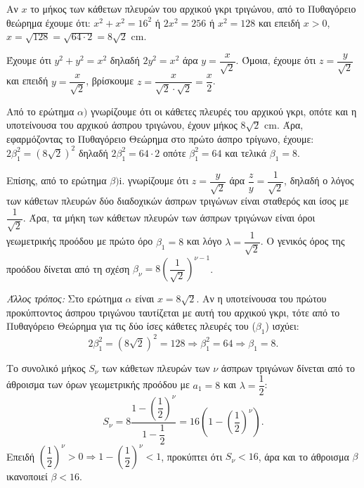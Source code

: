 
\begin{alist}
\item Αν $x$ το μήκος των κάθετων πλευρών του αρχικού γκρι τριγώνου, από το Πυθαγόρειο θεώρημα έχουμε ότι:
$x^2 + x^2 = 16^2$ ή $2x^2 = 256$ ή $x^2 = 128$
και επειδή $x > 0$, $x = \sqrt{128} = \sqrt{64 \cdot 2} = 8\sqrt{2}\text{ cm}$.

\item
\begin{rlist}
\item Έχουμε ότι $y^2 + y^2 = x^2$ δηλαδή $2y^2 = x^2$ άρα $y = \dfrac{x}{\sqrt{2}}$.
Όμοια, έχουμε ότι $z = \dfrac{y}{\sqrt{2}}$ και επειδή $y = \dfrac{x}{\sqrt{2}}$, βρίσκουμε $z = \dfrac{x}{\sqrt{2} \cdot \sqrt{2}} = \dfrac{x}{2}$.
\item Από το ερώτημα $\alpha)$ γνωρίζουμε ότι οι κάθετες πλευρές του αρχικού γκρι, οπότε και η υποτείνουσα του αρχικού άσπρου τριγώνου, έχουν μήκος $8\sqrt{2}\text{ cm}$. Άρα, εφαρμόζοντας το Πυθαγόρειο Θεώρημα στο πρώτο άσπρο τρίγωνο, έχουμε:
$2\beta_1^2 = (8\sqrt{2})^2$
δηλαδή
$2\beta_1^2 = 64 \cdot 2$
οπότε
$\beta_1^2 = 64$
και τελικά $\beta_1 = 8$.

Επίσης, από το ερώτημα $\beta)$i. γνωρίζουμε ότι $z = \dfrac{y}{\sqrt{2}}$ άρα $\dfrac{z}{y} = \dfrac{1}{\sqrt{2}}$, δηλαδή ο λόγος των κάθετων πλευρών δύο διαδοχικών άσπρων τριγώνων είναι σταθερός και ίσος με $\dfrac{1}{\sqrt{2}}$.
Άρα, τα μήκη των κάθετων πλευρών των άσπρων τριγώνων είναι όροι γεωμετρικής προόδου με πρώτο όρο $\beta_1 = 8$ και λόγο $\lambda = \dfrac{1}{\sqrt{2}}$. Ο γενικός όρος της προόδου δίνεται από τη σχέση $\beta_\nu = 8 \left(\dfrac{1}{\sqrt{2}}\right)^{\nu-1}$.

\textit{Άλλος τρόπος:}
Στο ερώτημα $\alpha$ είναι $x = 8\sqrt{2}$. Αν η υποτείνουσα του πρώτου προκύπτοντος άσπρου τριγώνου ταυτίζεται με αυτή του αρχικού γκρι, τότε από το Πυθαγόρειο Θεώρημα για τις δύο ίσες κάθετες πλευρές του ($\beta_1$) ισχύει:
\[2\beta_1^2 = (8\sqrt{2})^2 = 128 \Rightarrow \beta_1^2 = 64 \Rightarrow \beta_1 = 8.\]
\end{rlist}

\item Το συνολικό μήκος $S_\nu$ των κάθετων πλευρών των $\nu$ άσπρων τριγώνων δίνεται από το άθροισμα των όρων γεωμετρικής προόδου με $a_1=8$ και $\lambda=\dfrac{1}{2}$:
\[S_\nu = 8 \dfrac{1 - \left(\dfrac{1}{2}\right)^\nu}{1 - \dfrac{1}{2}} = 16 \left(1 - \left(\dfrac{1}{2}\right)^\nu\right).\]
Επειδή $\left(\dfrac{1}{2}\right)^\nu > 0 \Rightarrow 1 - \left(\dfrac{1}{2}\right)^\nu < 1$, προκύπτει ότι $S_\nu < 16$, άρα και το άθροισμα $\beta$ ικανοποιεί $\beta < 16$.
\end{alist}

